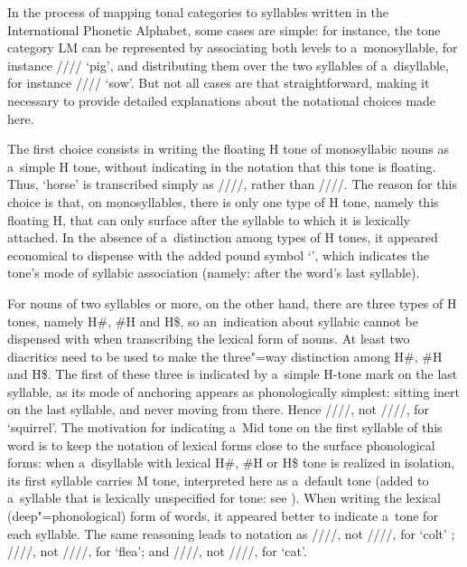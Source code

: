 {{{{{In the process of mapping tonal categories to syllables written in the International Phonetic Alphabet, some cases are simple: for
instance, the tone category LM can be represented by associating both levels to a~{monosyllable}, for
instance //// ‘pig’, and distributing them over the two syllables of a~disyllable, for instance
//// ‘sow’. But not all cases are that straightforward, making it necessary to provide detailed explanations about the notational choices made here.

The first choice consists in writing the floating H tone of monosyllabic nouns as a~simple H tone, without indicating in the notation that this tone is floating. Thus, ‘horse’ is transcribed simply as ////, rather than ////. The reason for this choice is that, on monosyllables, there is only one type of H tone, namely this floating H, that can only surface after the syllable to which it is lexically attached. In the
absence of a~distinction among types of H tones, it appeared economical to dispense with
the added pound symbol ‘\ipa{\#}’, which indicates the tone's mode of syllabic association (namely: after the word's last syllable). 

For nouns of two syllables or more, on the other hand, there are three types of H tones, namely
H\#, \#H and H\$, so an~indication about syllabic  cannot be dispensed with when transcribing the lexical form of nouns. At
least two diacritics need to be used to make the three"=way distinction among H\#, \#H and H\$. The
first of these three is indicated by a~simple H-tone mark  on the last syllable, as its mode of {anchoring} appears as
phonologically simplest: sitting inert on the last syllable, and never moving from there. Hence
////, not ////, for ‘squirrel’. The motivation for indicating a~Mid tone  on the first syllable of this word is to keep the notation of lexical forms close to the surface phonological forms: when a~disyllable with lexical H\#, \#H or H\$ tone is realized in isolation, its first syllable carries M tone, interpreted here as a~default tone (added to a~syllable that is lexically unspecified for tone: see ). When writing the lexical (deep"=phonological) form of words, it appeared better to indicate
a~tone for each syllable. The same reasoning leads to notation as ////, not ////, for ‘colt’ ; ////, not
////, for ‘flea’; and ////, not ////, for ‘cat’.

}}}}}
